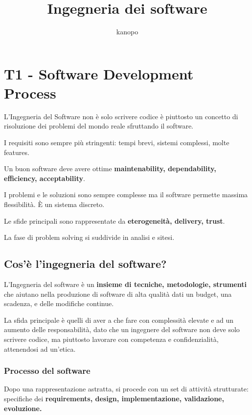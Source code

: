 \documentclass{article}
\begin{document}
    \author{kanopo}
    \title{Ingegneria dei software}

    \maketitle
    \tableofcontents

    \listoffigures
    \listoftables

    \newpage

\section{T1 - Software Development Process}
L'Ingegneria del Software non è solo scrivere codice è piuttosto un concetto 
di risoluzione dei problemi del mondo reale sfruttando il software.

I requisiti sono sempre più stringenti: tempi brevi, sistemi complessi, molte features.

Un buon software deve avere ottime \textbf{maintenability, dependability, efficiency, acceptability}.

I problemi e le soluzioni sono sempre complesse ma il software permette massima flessibilità.
È un sistema discreto.

Le sfide principali sono rappresentate da \textbf{eterogeneità, delivery, trust}.

La fase di problem solving si suddivide in analisi e sitesi.

\subsection{Cos'è l'ingegneria del software?}
L'Ingegneria del software è un \textbf{insieme di tecniche, metodologie, strumenti} che aiutano
nella produzione di software di alta qualità dati un budget, una scadenza, e delle modifiche continue.

La sfida principale è quelli di aver a che fare con complessità elevate e ad un aumento delle
responsabilità, dato che un ingegnere del software non deve solo scrivere codice, ma piuttosto lavorare
con competenza e confidenzialità, attenendosi ad un'etica.

\subsubsection{Processo del software}
Dopo una rappresentazione astratta, si procede con un set di attività strutturate:
specifiche dei \textbf{requirements, design, implementazione, validazione, evoluzione.}
\end{document}
